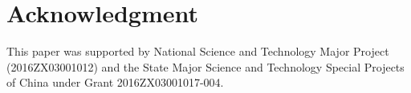 \documentclass[journal]{IEEEtran}
\begin{document}

%


\appendices





\section*{Acknowledgment}


This paper was supported by National Science and Technology Major Project (2016ZX03001012) and the State Major Science and Technology Special Projects of China under Grant 2016ZX03001017-004.


\ifCLASSOPTIONcaptionsoff
  \newpage
\fi



\end{document}
